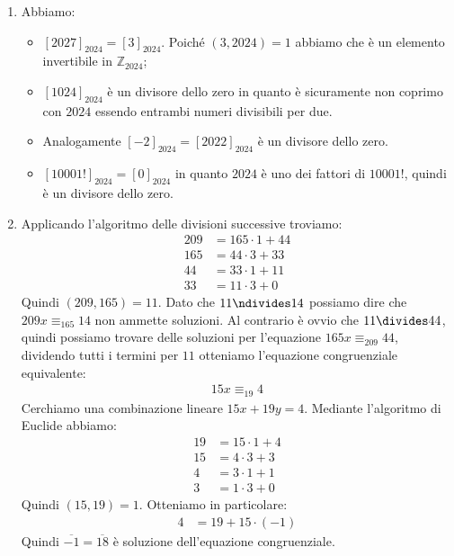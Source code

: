 \begin{enumerate}[label=(\textit{\roman*})]
	\item Abbiamo:
	\begin{itemize}
		\item $[2027]_{2024} = [3]_{2024}$. Poiché $(3,2024)=1$ abbiamo che è un elemento invertibile in $\mathbb{Z}_{2024}$;
		\item $[1024]_{2024}$ è un divisore dello zero in quanto è sicuramente non coprimo con $2024$ essendo entrambi numeri divisibili per due.
		\item Analogamente $[-2]_{2024}=[2022]_{2024}$ è un divisore dello zero.
		\item $[10001!]_{2024}=[0]_{2024}$ in quanto $2024$ è uno dei fattori di $10001!$, quindi è un divisore dello zero.
	\end{itemize}
	\item Applicando l'algoritmo delle divisioni successive troviamo:
	\begin{align*}
		209 &= 165 \cdot 1 + 44 \\
		165 &= 44 \cdot 3 + 33 \\
		44 &= 33 \cdot 1 + 11 \\
		33 &= 11 \cdot 3 + 0
	\end{align*}
	Quindi $(209,165)=11$. Dato che $11 \ndivides 14$ possiamo dire che $209x \equiv_{165} 14$ non ammette soluzioni. Al contrario è ovvio che $11 \divides 44$, quindi possiamo trovare delle soluzioni per l'equazione $165 x \equiv_{209} 44$, dividendo tutti i termini per $11$ otteniamo l'equazione congruenziale equivalente:
	\begin{align*}
		15x \equiv_{19} 4
	\end{align*}
	Cerchiamo una combinazione lineare $15x+19y=4$. Mediante l'algoritmo di Euclide abbiamo:
	\begin{align*}
		19 &= 15 \cdot 1 + 4 \\
		15 &= 4 \cdot 3 + 3 \\
		4 &= 3 \cdot 1 + 1 \\
		3 &= 1 \cdot 3 +0 
	\end{align*}
	Quindi $(15,19)=1$. Otteniamo in particolare:
	\begin{align*}
		4 &= 19 + 15\cdot (-1)
	\end{align*}
	Quindi $\overline{-1} = \overline{18}$ è soluzione dell'equazione congruenziale.
\end{enumerate}
